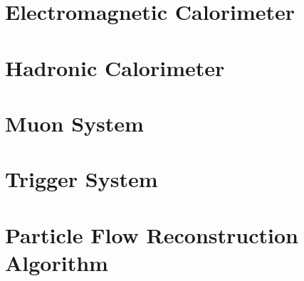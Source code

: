 \section{Electromagnetic Calorimeter}
\section{Hadronic Calorimeter}
\section{Muon System}
\section{Trigger System}
\section{Particle Flow Reconstruction Algorithm}
\ifx\master\undefined\fi
